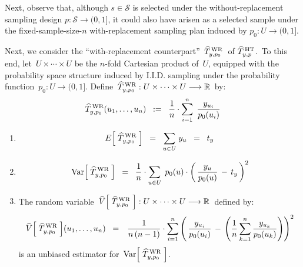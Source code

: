 \vskip 0.5cm
\noindent
Next, observe that, although \;$s \in \mathcal{S}$\; is selected under the
without-replacement sampling design \;$p : \mathcal{S} \longrightarrow (0,1]$,\;
it could also have arisen as a selected sample under the fixed-sample-size-$n$
with-replacement sampling plan induced by \;$p_{0} : U \longrightarrow (0,1]$.\;

\vskip 0.5cm
\noindent
Next, we consider the ``with-replacement counterpart''
\,$\widehat{T}^{\,\textnormal{WR}}_{y,p_{0}}$\,
of
\;$\widehat{T}^{\,\textnormal{HT}}_{y,p}$.\,
To this end, let \,$U \times \cdots \times U$ be the $n$-fold Cartesian product of \,$U$,
equipped with the probability space structure induced by I.I.D. sampling under
the probability function \,$p_{0} : U \longrightarrow (0,1]$.
Define
\,$\widehat{T}^{\,\textnormal{WR}}_{y,p_{0}} : U \times \cdots \times U \longrightarrow \Re$\,
by:
\begin{equation*}
\widehat{T}^{\,\textnormal{WR}}_{y,p_{0}}(u_{1},\ldots,u_{n})
\;\; := \;\;
	\dfrac{1}{n}\cdot\overset{n}{\underset{i=1}{\sum}}\;\, \dfrac{y_{u_{i}}}{p_{0}(u_{i})}
\end{equation*}
\begin{proposition}
\mbox{}\vskip 0.1cm
\begin{enumerate}
\item
	\begin{equation*}
	E\!\left[\;\widehat{T}^{\,\textnormal{WR}}_{y,p_{0}}\;\right]
	\;\; = \;\;
		\underset{u \in U}{\sum}\; y_{u}
	\;\; = \;\;
		t_{y}
	\end{equation*}
\item
	\begin{equation*}
	\Var\!\left[\;\widehat{T}^{\,\textnormal{WR}}_{y,p_{0}}\;\right]
	\;\; = \;\;
		\dfrac{1}{n}\cdot
		\underset{u \in U}{\sum}\;\,
		p_{0}(u)\cdot\left(\,\dfrac{y_{u}}{p_{0}(u)}\,-\,t_{y}\,\right)^{2}
	\end{equation*}
\item
	The random variable
	\,$\widehat{V}\!\left[\;\widehat{T}^{\,\textnormal{WR}}_{y,p_{0}}\;\right] :
	U \times \cdots \times U \longrightarrow \Re$\, defined by:
	\begin{equation*}
	\widehat{V}\!\left[\;\widehat{T}^{\,\textnormal{WR}}_{y,p_{0}}\;\right]\!(u_{1},\ldots,u_{n})
	\;\; = \;\;\,
		\dfrac{1}{n\,(n-1)}\cdot\overset{n}{\underset{i = 1}{\sum}}
		\left(\,
			\dfrac{y_{u_{i}}}{p_{0}(u_{i})}
			\,-\,
			\left(\dfrac{1}{n}\,\overset{n}{\underset{k=1}{\sum}}\,\dfrac{y_{u_{k}}}{p_{0}(u_{k})}\right)
			\right)^{2}
	\end{equation*}
	is an unbiased estimator for \,$\Var\!\left[\;\widehat{T}^{\,\textnormal{WR}}_{y,p_{0}}\;\right]$.
\end{enumerate}
\end{proposition}
